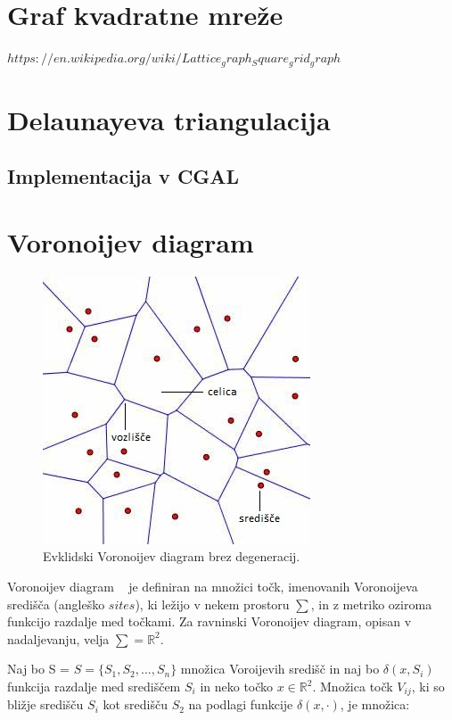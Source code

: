 \documentclass[a4paper, 12pt]{book}
\begin{document}
\section{Graf kvadratne mreže}
$https://en.wikipedia.org/wiki/Lattice_graph_Square_grid_graph$

\section{Delaunayeva triangulacija}
\subsection{Implementacija v CGAL}


\section{Voronoijev diagram}
\begin{figure}
\centerline{\includegraphics[scale=0.8]{pics/vd-sredisce.jpg}}
\caption{Evklidski Voronoijev diagram brez degeneracij.}
\label{vd}
\end{figure}

Voronoijev diagram ~\cite{cgalVor} je definiran na množici točk, imenovanih Voronoijeva središča (angleško $sites$), ki ležijo v nekem prostoru $\sum$, in z metriko oziroma funkcijo razdalje med točkami. Za ravninski Voronoijev diagram, opisan v nadaljevanju, velja $\sum = \mathbb{R}^2$.

Naj bo S = $S = \{S_1,S_2,...,S_n\}$ množica Voroijevih središč in naj bo $\delta(x,S_i)$ funkcija razdalje med središčem $S_i$ in neko točko $x \in \mathbb{R}^2$. Množica točk $V_{ij}$, ki so bližje središču $S_i$ kot središču $S_2$ na podlagi funkcije $\delta(x,\cdot)$, je množica:
\end{document}
